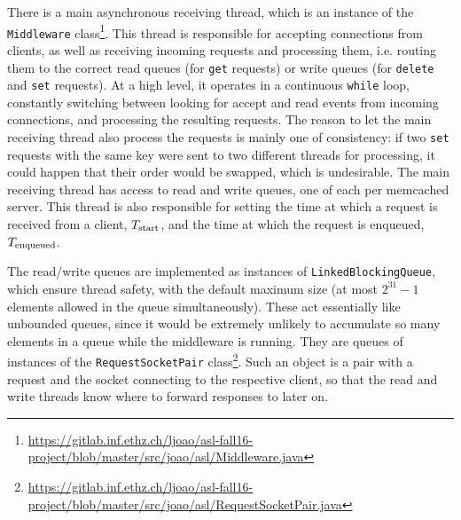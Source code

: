 \documentclass[11pt]{article}
\begin{document}
There is a main asynchronous receiving thread, which is an instance of the \texttt{Middleware} class\footnote{\url{https://gitlab.inf.ethz.ch/ljoao/asl-fall16-project/blob/master/src/joao/asl/Middleware.java}}. This thread is responsible for accepting connections from clients, as well as receiving incoming requests and processing them, i.e. routing them to the correct read queues (for \texttt{get} requests) or write queues (for \texttt{delete} and \texttt{set} requests). At a high level, it operates in a continuous \texttt{while} loop, constantly switching between looking for accept and read events from incoming connections, and processing the resulting requests. The reason to let the main receiving thread also process the requests is mainly one of consistency: if two \texttt{set} requests with the same key were sent to two different threads for processing, it could happen that their order would be swapped, which is undesirable. The main receiving thread has access to read and write queues, one of each per memcached server. This thread is also responsible for setting the time at which a request is received from a client, $T_{\textnormal{start}}$, and the time at which the request is enqueued, $T_{\textnormal{enqueued}}$.

The read/write queues are implemented as instances of \texttt{LinkedBlockingQueue}, which ensure thread safety, with the default maximum size (at most $2^{31}-1$ elements allowed in the queue simultaneously). These act essentially like unbounded queues, since it would be extremely unlikely to accumulate so many elements in a queue while the middleware is running. They are queues of instances of the \texttt{RequestSocketPair} class\footnote{\url{https://gitlab.inf.ethz.ch/ljoao/asl-fall16-project/blob/master/src/joao/asl/RequestSocketPair.java}}. Such an object is a pair with a request and the socket connecting to the respective client, so that the read and write threads know where to forward responses to later on.
\end{document}
